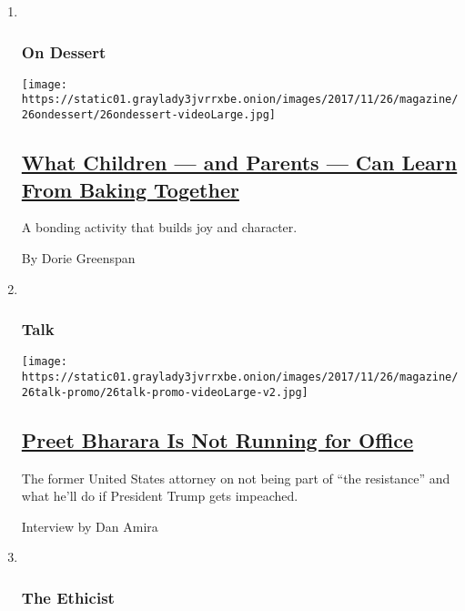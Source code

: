 \begin{enumerate}
\def\labelenumi{\arabic{enumi}.}
\item ~
  \hypertarget{on-dessert}{%
  \subsubsection{On Dessert}\label{on-dessert}}

  \texttt{[image: https://static01.graylady3jvrrxbe.onion/images/2017/11/26/magazine/26ondessert/26ondessert-videoLarge.jpg]}

  \hypertarget{what-children--and-parents--can-learn-from-baking-together}{%
  \subsection{\texorpdfstring{\href{/2017/11/21/magazine/what-children-and-parents-can-learn-from-baking-together.html}{What
  Children --- and Parents --- Can Learn From Baking
  Together}}{What Children --- and Parents --- Can Learn From Baking Together}}\label{what-children--and-parents--can-learn-from-baking-together}}

  A bonding activity that builds joy and character.

  By Dorie Greenspan
\item ~
  \hypertarget{talk}{%
  \subsubsection{Talk}\label{talk}}

  \texttt{[image: https://static01.graylady3jvrrxbe.onion/images/2017/11/26/magazine/26talk-promo/26talk-promo-videoLarge-v2.jpg]}

  \hypertarget{preet-bharara-is-not-running-for-office}{%
  \subsection{\texorpdfstring{\href{/2017/11/20/magazine/preet-bharara-is-not-running-for-office.html}{Preet
  Bharara Is Not Running for
  Office}}{Preet Bharara Is Not Running for Office}}\label{preet-bharara-is-not-running-for-office}}

  The former United States attorney on not being part of ``the
  resistance'' and what he'll do if President Trump gets impeached.

  Interview by Dan Amira
\item ~
  \hypertarget{the-ethicist}{%
  \subsubsection{The Ethicist}\label{the-ethicist}}


\end{enumerate}
